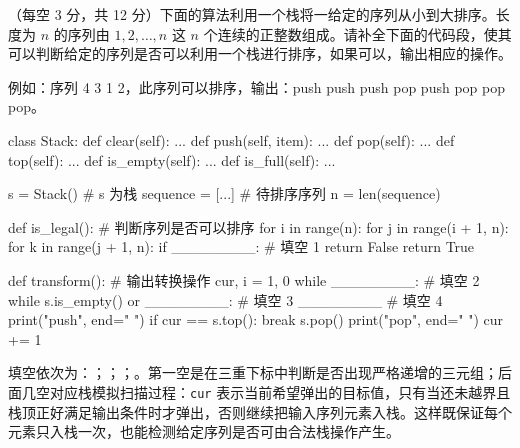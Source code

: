 \begin{question}
（每空 3 分，共 12 分）下面的算法利用一个栈将一给定的序列从小到大排序。长度为 $n$ 的序列由 $1, 2, \dots, n$ 这 $n$ 个连续的正整数组成。请补全下面的代码段，使其可以判断给定的序列是否可以利用一个栈进行排序，如果可以，输出相应的操作。

例如：序列 4 3 1 2，此序列可以排序，输出：push push push pop push pop pop pop。

\begin{pycode}
class Stack:
    def clear(self): ...
    def push(self, item): ...
    def pop(self): ...
    def top(self): ...
    def is_empty(self): ...
    def is_full(self): ...


s = Stack()                  # s 为栈
sequence = [...]             # 待排序序列
n = len(sequence)


def is_legal():              # 判断序列是否可以排序
    for i in range(n):
        for j in range(i + 1, n):
            for k in range(j + 1, n):
                if ________:          # 填空 1
                    return False
    return True


def transform():             # 输出转换操作
    cur, i = 1, 0
    while ________:           # 填空 2
        while s.is_empty() or ________:    # 填空 3
            ________          # 填空 4
            print("push", end=" ")
            if cur == s.top():
                break
        s.pop()
        print("pop", end=" ")
        cur += 1
\end{pycode}
\begin{solution}
填空依次为：\texttt{}；\texttt{}；\texttt{}；\texttt{}。第一空是在三重下标中判断是否出现严格递增的三元组；后面几空对应栈模拟扫描过程：\texttt{cur} 表示当前希望弹出的目标值，只有当还未越界且栈顶正好满足输出条件时才弹出，否则继续把输入序列元素入栈。这样既保证每个元素只入栈一次，也能检测给定序列是否可由合法栈操作产生。
\end{solution}
\end{question}

